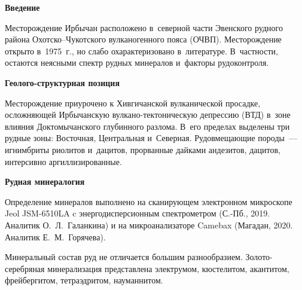 
 



\makeProcTitle

\textbf{Введение}

Месторождение Ирбычан расположено в~северной части Эвенского рудного района Охотско–Чукотского вулканогенного пояса (ОЧВП). Месторождение открыто в~1975~г., но слабо охарактеризовано в~литературе. В~частности, остаются неясными спектр рудных минералов и~факторы рудоконтроля.

\textbf{Геолого-структурная позиция}

Месторождение приурочено к Хивгичанской вулканической просадке, осложняющей Ирбычанскую вулкано-тектоническую депрессию (ВТД) в~зо\-не влияния Доктомычанского глубинного разлома. В~его пределах выделены три рудные зоны: Восточная, Центральная и~Северная. Рудовмещающие породы~--- игнимбриты риолитов и~дацитов, прорванные дайками андезитов, дацитов, интерсивно аргиллизированные.

\textbf{Рудная минералогия}

Определение минералов выполнено на сканирующем электронном микроскопе Jeol JSM-6510LA c энергодисперсионным спектрометром (С.-Пб., 2019. Аналитик О.~Л.~Галанкина) и на микроанализаторе Camebax (Магадан, 2020. Аналитик Е.~М.~Горячева).

Минеральный состав руд не отличается большим разнообразием. Золото-серебряная минерализация представлена электрумом, кюстелитом, акантитом, фрейбергитом, тетраэдритом, науманнитом.

